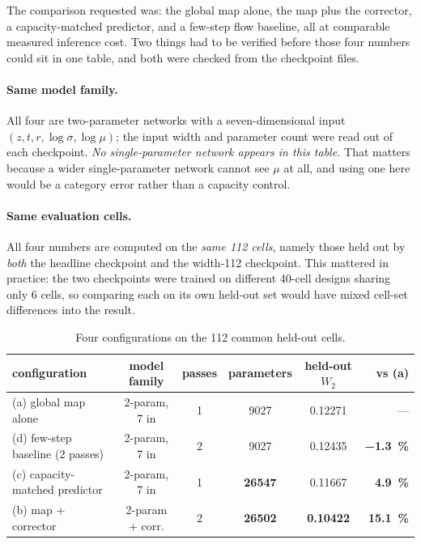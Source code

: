 ﻿\documentclass[11pt,a4paper]{article}
\newcommand{\Wtwo}{W_2}
\begin{document}
The comparison requested was: the global map alone, the map plus the corrector, a
capacity-matched predictor, and a few-step flow baseline, all at comparable measured inference
cost. Two things had to be verified before those four numbers could sit in one table, and both
were checked from the checkpoint files.

\paragraph{Same model family.} All four are two-parameter networks with a seven-dimensional
input $(z,t,r,\log\sigma,\log\mu)$; the input width and parameter count were read out of each
checkpoint. \emph{No single-parameter network appears in this table.} That matters because a
wider single-parameter network cannot see $\mu$ at all, and using one here would be a category
error rather than a capacity control.

\paragraph{Same evaluation cells.} All four numbers are computed on the \emph{same 112 cells},
namely those held out by \emph{both} the headline checkpoint and the width-112 checkpoint. This
mattered in practice: the two checkpoints were trained on different 40-cell designs sharing only
6 cells, so comparing each on its own held-out set would have mixed cell-set differences into
the result.

\begin{table}[h]
\centering\small
\begin{tabular}{@{}lccccr@{}}
\toprule
configuration & model family & passes & parameters & held-out $\Wtwo$ & vs (a) \\
\midrule
(a) global map alone & 2-param, 7 in & 1 & \num{9027} & 0.12271 & --- \\
(d) few-step baseline (2 passes) & 2-param, 7 in & 2 & \num{9027} & 0.12435 &
  \textbf{\SI{-1.3}{\percent}} \\
(c) capacity-matched predictor & 2-param, 7 in & 1 & \textbf{\num{26547}} & 0.11667 &
  \textbf{\SI{4.9}{\percent}} \\
(b) map + corrector & 2-param + corr. & 2 & \textbf{\num{26502}} & \textbf{0.10422} &
  \textbf{\SI{15.1}{\percent}} \\
\bottomrule
\end{tabular}
\caption{Four configurations on the 112 common held-out cells.}
\label{tab:fourway}
\end{table}
\end{document}
